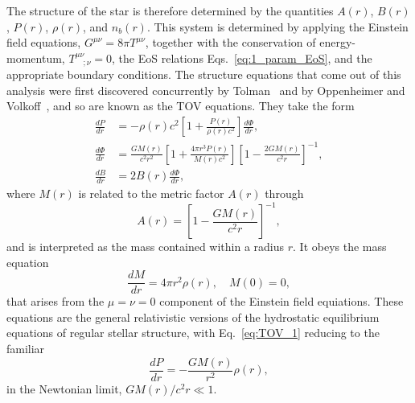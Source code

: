 The structure of the star is therefore determined by the quantities $A(r)$, $B(r)$, $P(r)$, $\rho(r)$, and $n_b(r)$. This system is determined by applying the Einstein field equations, $G^{\mu\nu} = 8\pi T^{\mu\nu}$, together with the conservation of energy-momentum, $T^{\mu\nu}_{\quad;\nu}=0$, the EoS relations Eqs.~\ref{eq:1_param_EoS}, and the appropriate boundary conditions. The structure equations that come out of this analysis were first discovered concurrently by Tolman~\cite{Tolman:1939jz_StaticSolutionsEinstein} and by Oppenheimer and Volkoff~\cite{Oppenheimer:1939ne_MassiveNeutronCores}, and so are known as the TOV equations. They take the form
\begin{align}
    \frac{dP}{dr} &= -\rho(r) c^2  \left[ 1 + \frac{P(r)}{\rho(r) c^2} \right]\frac{d\Phi}{dr},\label{eq:TOV_1}\\
    \frac{d\Phi}{dr} & = \frac{G M(r)}{c^2 r^2} \left[ 1 + \frac{4\pi r^3 P(r)}{M(r)c^2} \right] \left[ 1 - \frac{2 G M(r)}{c^2 r}\right]^{-1}\label{eq:TOV_2},\\
    \frac{dB}{dr} & = 2B(r) \frac{d\Phi}{dr},\label{eq:TOV_3}
\end{align}
where $M(r)$ is related to the metric factor $A(r)$ through
\begin{equation}
    A(r) = \left[ 1 - \frac{G M(r)}{c^2 r} \right]^{-1},
\end{equation}
and is interpreted as the mass contained within a radius $r$. It obeys the mass equation 
\begin{equation}
    \frac{dM}{dr} = 4\pi r^2 \rho(r),\quad M(0) = 0,
\end{equation}
that arises from the $\mu = \nu = 0$ component of the Einstein field equiations. 
These equations are the general relativistic versions of the hydrostatic equilibrium equations of regular stellar structure, with Eq.~\ref{eq:TOV_1} reducing to the familiar 
\begin{equation}
    \frac{dP}{dr} = -\frac{GM(r)}{r^2}\rho(r),
\end{equation}
in the Newtonian limit, $GM(r)/c^2 r \ll 1$.

